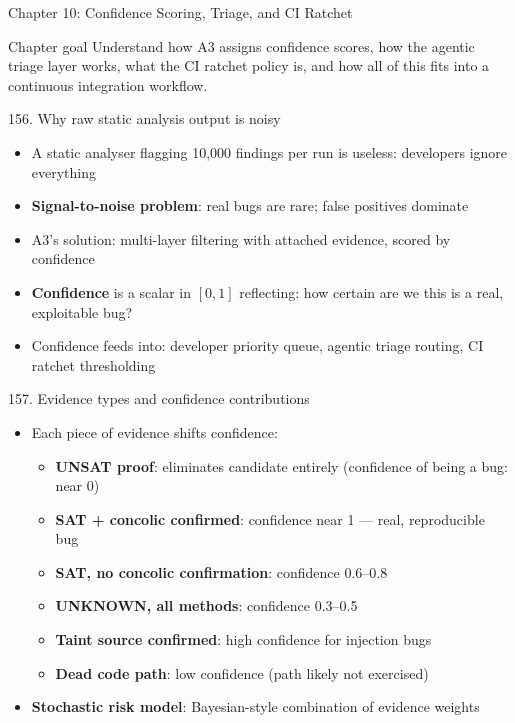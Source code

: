 \documentclass[aspectratio=169]{beamer}
\begin{document}

\begin{frame}{Chapter 10: Confidence Scoring, Triage, and CI Ratchet}
\begin{block}{Chapter goal}
Understand how A3 assigns confidence scores, how the agentic triage layer works,
what the CI ratchet policy is, and how all of this fits into a continuous integration workflow.
\end{block}
\end{frame}

\begin{frame}{156. Why raw static analysis output is noisy}
\begin{itemize}
  \item A static analyser flagging 10,000 findings per run is useless: developers ignore everything
  \item \textbf{Signal-to-noise problem}: real bugs are rare; false positives dominate
  \item A3's solution: multi-layer filtering with attached evidence, scored by confidence
  \item \textbf{Confidence} is a scalar in \([0,1]\) reflecting: how certain are we this is a real, exploitable bug?
  \item Confidence feeds into: developer priority queue, agentic triage routing, CI ratchet thresholding
\end{itemize}
\end{frame}

\begin{frame}{157. Evidence types and confidence contributions}
\begin{itemize}
  \item Each piece of evidence shifts confidence:
  \begin{itemize}
    \item \textbf{UNSAT proof}: eliminates candidate entirely (confidence of being a bug: near 0)
    \item \textbf{SAT + concolic confirmed}: confidence near 1 --- real, reproducible bug
    \item \textbf{SAT, no concolic confirmation}: confidence 0.6--0.8
    \item \textbf{UNKNOWN, all methods}: confidence 0.3--0.5
    \item \textbf{Taint source confirmed}: high confidence for injection bugs
    \item \textbf{Dead code path}: low confidence (path likely not exercised)
  \end{itemize}
  \item \textbf{Stochastic risk model}: Bayesian-style combination of evidence weights
\end{itemize}
\end{frame}
\end{document}
